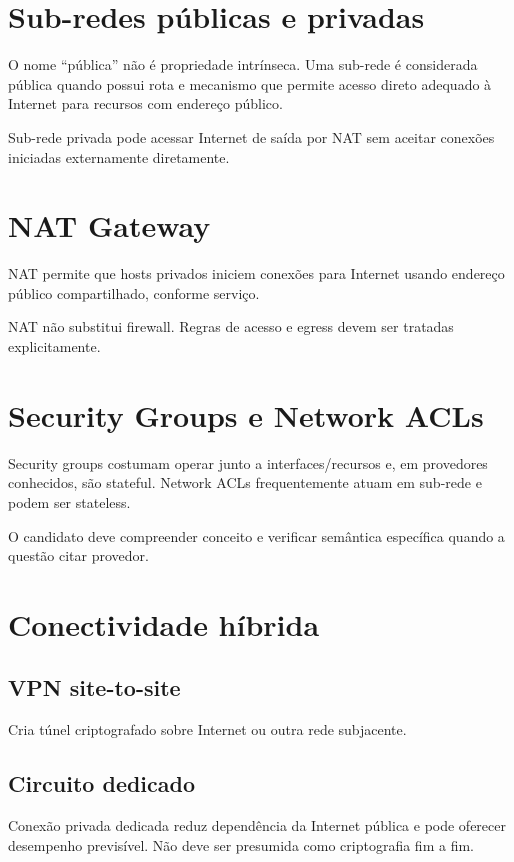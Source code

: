 \section{Sub-redes públicas e privadas}

O nome ``pública'' não é propriedade intrínseca. Uma sub-rede é considerada pública quando possui rota e mecanismo que permite acesso direto adequado à Internet para recursos com endereço público.

Sub-rede privada pode acessar Internet de saída por NAT sem aceitar conexões iniciadas externamente diretamente.

\section{NAT Gateway}

NAT permite que hosts privados iniciem conexões para Internet usando endereço público compartilhado, conforme serviço.

NAT não substitui firewall. Regras de acesso e egress devem ser tratadas explicitamente.

\section{Security Groups e Network ACLs}

Security groups costumam operar junto a interfaces/recursos e, em provedores conhecidos, são stateful. Network ACLs frequentemente atuam em sub-rede e podem ser stateless.

O candidato deve compreender conceito e verificar semântica específica quando a questão citar provedor.

\section{Conectividade híbrida}

\subsection{VPN site-to-site}

Cria túnel criptografado sobre Internet ou outra rede subjacente.

\subsection{Circuito dedicado}

Conexão privada dedicada reduz dependência da Internet pública e pode oferecer desempenho previsível. Não deve ser presumida como criptografia fim a fim.

